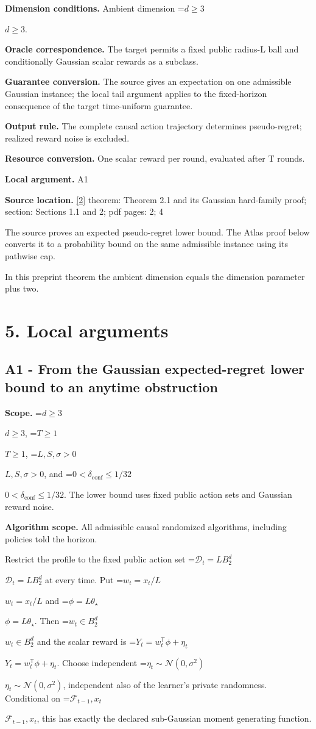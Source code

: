 \documentclass[10pt,a4paper]{article}
\newcommand{\AtlasMath}[1]{\par\begingroup\centering\setbox0=\hbox{$\displaystyle #1$}\ifdim\wd0>1.4\linewidth\typeout{ATLAS WIDE FORMULA: \the\wd0}\fi\ifdim\wd0>\linewidth\resizebox{\linewidth}{!}{\box0}\else\box0\fi\par\endgroup}
\newcommand{\AtlasInlineMath}[1]{\begingroup\setbox0=\hbox{$#1$}\ifdim\wd0>.4\linewidth\endgroup\AtlasMath{#1}\else\endgroup$#1$\fi}
\begin{document}
\textbf{Dimension conditions.} Ambient dimension \AtlasInlineMath{d\ge3}.

\textbf{Oracle correspondence.} The target permits a fixed public radius-L ball and conditionally Gaussian scalar rewards as a subclass.

\textbf{Guarantee conversion.} The source gives an expectation on one admissible Gaussian instance; the local tail argument applies to the fixed-horizon consequence of the target time-uniform guarantee.

\textbf{Output rule.} The complete causal action trajectory determines pseudo-regret; realized reward noise is excluded.

\textbf{Resource conversion.} One scalar reward per round, evaluated after T rounds.

\textbf{Local argument.} A1

\textbf{Source location.} \href{https://arxiv.org/abs/2502.17175v1}{[2]} theorem: Theorem 2.1 and its Gaussian hard-family proof; section: Sections 1.1 and 2; pdf pages: 2; 4

The source proves an expected pseudo-regret lower bound. The Atlas proof below converts it to a probability bound on the same admissible instance using its pathwise cap.

In this preprint theorem the ambient dimension equals the dimension parameter plus two.

\section{5. Local arguments}
\subsection{A1 - From the Gaussian expected-regret lower bound to an anytime obstruction}
\textbf{Scope.} \AtlasInlineMath{d\ge3}, \AtlasInlineMath{T\ge1}, \AtlasInlineMath{L,S,\sigma>0}, and \AtlasInlineMath{0<\delta_{\mathrm{conf}}\le1/32}. The lower bound uses fixed public action sets and Gaussian reward noise.

\textbf{Algorithm scope.} All admissible causal randomized algorithms, including policies told the horizon.

Restrict the profile to the fixed public action set \AtlasInlineMath{\mathcal D_t=L B_2^d} at every time. Put \AtlasInlineMath{w_t=x_t/L} and \AtlasInlineMath{\phi=L\theta_\star}. Then \AtlasInlineMath{w_t\in B_2^d} and the scalar reward is \AtlasInlineMath{Y_t=w_t^{\mathsf T}\phi+\eta_t}. Choose independent \AtlasInlineMath{\eta_t\sim\mathcal N(0,\sigma^2)}, independent also of the learner's private randomness. Conditional on \AtlasInlineMath{\mathcal F_{t-1},x_t}, this has exactly the declared sub-Gaussian moment generating function.
\end{document}
